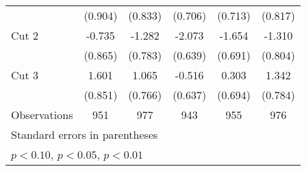 \begin{table}[htbp]
\begin{tabular}{l*{5}{c}}
                    &     (0.904)         &     (0.833)         &     (0.706)         &     (0.713)         &     (0.817)         \\
Cut 2               &      -0.735         &      -1.282         &      -2.073\sym{***}&      -1.654\sym{**} &      -1.310         \\
                    &     (0.865)         &     (0.783)         &     (0.639)         &     (0.691)         &     (0.804)         \\
Cut 3               &       1.601\sym{*}  &       1.065         &      -0.516         &       0.303         &       1.342\sym{*}  \\
                    &     (0.851)         &     (0.766)         &     (0.637)         &     (0.694)         &     (0.784)         \\
\hline
Observations        &         951         &         977         &         943         &         955         &         976         \\
\hline\hline
\multicolumn{6}{l}{\footnotesize Standard errors in parentheses}\\
\multicolumn{6}{l}{\footnotesize \sym{*} \(p<0.10\), \sym{**} \(p<0.05\), \sym{***} \(p<0.01\)}\\
\end{tabular}
\end{table}
